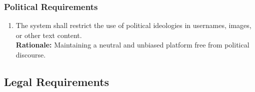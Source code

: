 \documentclass[]{article}
\begin{document}
\subsubsection{Political Requirements}
\label{ssub:political_requirements}
\begin{enumerate}[{CP-P}1. ]
    \item The system shall restrict the use of political ideologies in usernames, images, or other text content.\\
    \textbf{Rationale:} Maintaining a neutral and unbiased platform free from political discourse.

\end{enumerate}


\subsection{Legal Requirements}
\label{sub:legal_requirements}
\end{document}
